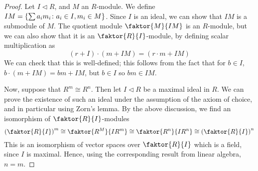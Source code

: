 \begin{proof}
	Let \( I \triangleleft R \), and \( M \) an \( R \)-module.
	We define \( IM = \qty{\sum a_i m_i \colon a_i \in I, m_i \in M} \).
	Since \( I \) is an ideal, we can show that \( IM \) is a submodule of \( M \).
	The quotient module \( \faktor{M}{IM} \) is an \( R \)-module, but we can also show that it is an \( \faktor{R}{I} \)-module, by defining scalar multiplication as
	\[ (r+I) \cdot (m+IM) = (r \cdot m + IM) \]
	We can check that this is well-defined; this follows from the fact that for \( b \in I \), \( b \cdot (m + IM) = bm + IM \), but \( b \in I \) so \( bm \in IM \).

	Now, suppose that \( R^m \cong R^n \).
	Then let \( I \triangleleft R \) be a maximal ideal in \( R \).
	We can prove the existence of such an ideal under the assumption of the axiom of choice, and in particular using Zorn's lemma.
	By the above discussion, we find an isomorphism of \( \faktor{R}{I} \)-modules
	\[ \qty(\faktor{R}{I})^m \cong \faktor{R^M}{IR^m} \cong \faktor{R^n}{IR^n} \cong \qty(\faktor{R}{I})^n \]
	This is an isomorphism of vector spaces over \( \faktor{R}{I} \) which is a field, since \( I \) is maximal.
	Hence, using the corresponding result from linear algebra, \( n = m \).
\end{proof}

